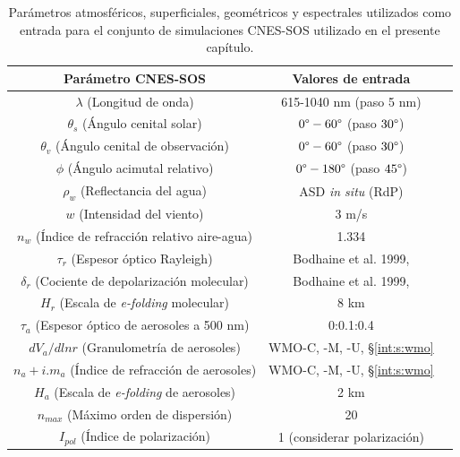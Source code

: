         \begin{table}
        \caption{Parámetros atmosféricos, superficiales, geométricos y espectrales utilizados como entrada para el conjunto de simulaciones CNES-SOS utilizado en el presente capítulo.}
        \centering
        \begin{tabular}{|c|c|c|}
        \hline
        \textbf{Parámetro CNES-SOS}	& \textbf{Valores de entrada}\\
        \hline
        $\lambda$ (Longitud de onda) & 615-1040 nm (paso 5 nm)\\
        \hline
        $\theta_{s}$ (Ángulo cenital solar) & $0\degree-60\degree$ (paso $30\degree$)\\
        \hline
        $\theta_{v}$ (Ángulo cenital de observación) & $0\degree-60\degree$ (paso $30\degree$)\\
        \hline
        $\phi$ (Ángulo acimutal relativo) & $0\degree-180\degree$ (paso $45\degree$)\\
        \hline
        $\rho_{w}$ (Reflectancia del agua) & ASD \textit{in situ} (RdP)\\
        \hline
        $w$ (Intensidad del viento) & 3 m/s\\
        \hline
        $n_{w}$ (Índice de refracción relativo aire-agua) & 1.334\\
        \hline
        $\tau_{r}$ (Espesor óptico Rayleigh) & Bodhaine et al. 
        1999, \cite{bodhaine1999}\\
        \hline
        $\delta_{r}$ (Cociente de depolarización molecular) & Bodhaine et al. 
        1999, \cite{bodhaine1999}\\
        \hline
        $H_{r}$ (Escala de \textit{e-folding} molecular) & 8 km\\
        \hline
        $\tau_{a}$ (Espesor óptico de aerosoles a 500 nm) & 0:0.1:0.4\\
        \hline
        $dV_{a}/dlnr$ (Granulometría de aerosoles) & WMO-C, -M, -U, \S \ref{int:s:wmo}\\
        \hline
        $n_{a} + i.m_{a}$ (Índice de refracción de aerosoles) & WMO-C, -M, -U, \S \ref{int:s:wmo}\\
        \hline
        $H_{a}$ (Escala de \textit{e-folding} de aerosoles) & 2 km\\
        \hline
        $n_{max}$ (Máximo orden de dispersión) & 20\\
        \hline
        $I_{pol}$ (Índice de polarización) & 1 (considerar polarización)\\
        \hline
        \end{tabular}
        \label{blr:tab:sos}
        \end{table}
        
